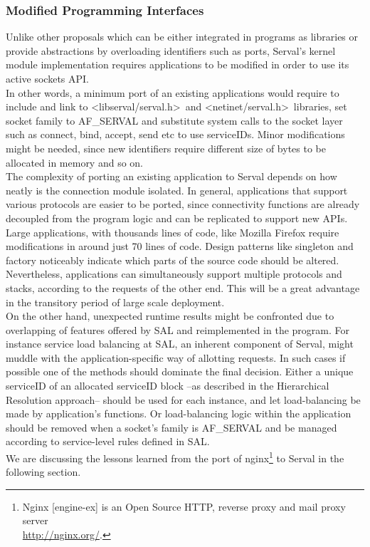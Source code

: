 \subsubsection{Modified Programming Interfaces}
Unlike other proposals which can be either integrated in programs as libraries or provide abstractions by overloading identifiers such as ports, Serval's kernel module implementation requires applications to be modified in order to use its active sockets API.\\
\indent In other words, a minimum port of an existing applications would require to include and link to \textless libserval/serval.h\textgreater ~and \textless netinet/serval.h\textgreater ~libraries, set socket family to AF\_SERVAL and substitute system calls to the socket layer such as connect, bind, accept, send etc to use serviceIDs.
Minor modifications might be needed, since new identifiers require different size of bytes to be allocated in memory and so on.\\
\indent The complexity of porting an existing application to Serval depends on how neatly is the connection module isolated.
In general, applications that support various protocols are easier to be ported, since connectivity functions are already decoupled from the program logic and can be replicated to support new APIs.
Large applications, with thousands lines of code, like Mozilla Firefox require modifications in around just 70 lines of code.
Design patterns like singleton and factory noticeably indicate which parts of the source code should be altered.\\
\indent Nevertheless, applications can simultaneously support multiple protocols and stacks, according to the requests of the other end.
This will be a great advantage in the transitory period of large scale deployment.\\
\indent On the other hand, unexpected runtime results might be confronted due to overlapping of features offered by SAL and reimplemented in the program.
For instance service load balancing at SAL, an inherent component of Serval, might muddle with the application-specific way of allotting requests.
In such cases if possible one of the methods should dominate the final decision.
Either a unique serviceID of an allocated serviceID block --as described in the Hierarchical Resolution approach-- should be used for each instance, and let load-balancing be made by application's functions.
Or load-balancing logic within the application should be removed when a socket's family is AF\_SERVAL and be managed according to service-level rules defined in SAL.\\
\indent We are discussing the lessons learned from the port of nginx\footnote{Nginx [engine-ex] is an Open Source HTTP, reverse proxy and mail proxy server\\ \url{http://nginx.org/}.} to Serval in the following section.


